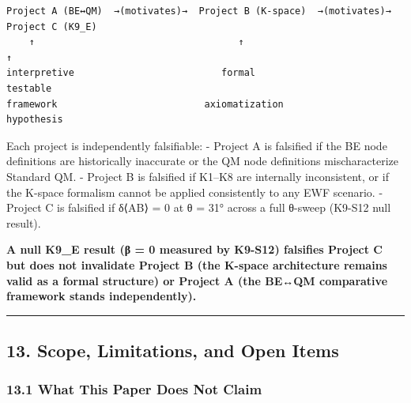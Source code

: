 \documentclass[
  11pt,
]{article}
\begin{document}
\begin{verbatim}
Project A (BE↔QM)  →(motivates)→  Project B (K-space)  →(motivates)→  Project C (K9_E)
    ↑                                    ↑                                    ↑
interpretive                          formal                             testable
framework                          axiomatization                       hypothesis
\end{verbatim}

Each project is independently falsifiable: - Project A is falsified if
the BE node definitions are historically inaccurate or the QM node
definitions mischaracterize Standard QM. - Project B is falsified if
K1--K8 are internally inconsistent, or if the K-space formalism cannot
be applied consistently to any EWF scenario. - Project C is falsified if
δ⟨AB⟩ = 0 at θ = 31° across a full θ-sweep (K9-S12 null result).

\textbf{A null K9\_E result (β = 0 measured by K9-S12) falsifies Project
C but does not invalidate Project B (the K-space architecture remains
valid as a formal structure) or Project A (the BE↔QM comparative
framework stands independently).}

\begin{center}\rule{0.5\linewidth}{0.5pt}\end{center}

\subsection{13. Scope, Limitations, and Open
Items}\label{scope-limitations-and-open-items}

\subsubsection{13.1 What This Paper Does Not
Claim}\label{what-this-paper-does-not-claim}
\end{document}
